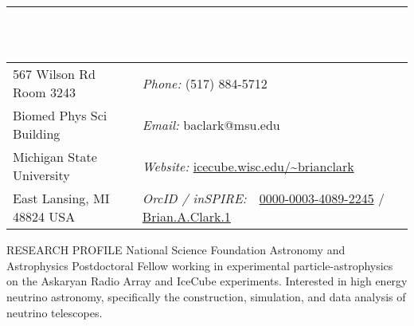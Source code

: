 \documentclass{resume} %
\begin{document}

\vspace{-1cm}
\rule{\textwidth}{0.1cm} \\ \\
\begin{tabular}{@{}p{2in}p{4in}}
567 Wilson Rd Room 3243             & {\it Phone:}  (517) 884-5712 \\            
Biomed Phys Sci Building   & {\it Email:}  baclark@msu.edu
 \\         
Michigan State University & {\it Website:} \url{icecube.wisc.edu/~brianclark} \\       
East Lansing, MI  48824 USA  & {\it OrcID / inSPIRE:} \,\,      \href{https://orcid.org/0000-0003-4089-2245}{0000-0003-4089-2245}  / \href{https://inspirehep.net/author/profile/Brian.A.Clark.1}{Brian.A.Clark.1}\\     
\end{tabular}


\begin{rSection}{RESEARCH PROFILE}
National Science Foundation Astronomy and Astrophysics Postdoctoral Fellow working in experimental particle-astrophysics on the Askaryan Radio Array and IceCube experiments. Interested in high energy neutrino astronomy, specifically the construction, simulation, and data analysis of neutrino telescopes.
\end{rSection}
\end{document}
